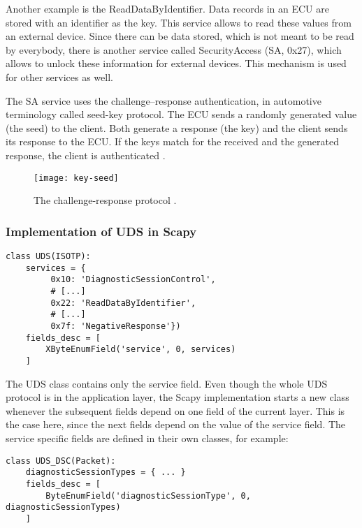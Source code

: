 Another example is the ReadDataByIdentifier. Data records in an ECU are stored with an identifier as the key. This service allows to read these values from an external device. Since there can be data stored, which is not meant to be read by everybody, there is another service called SecurityAccess (SA, 0x27), which allows to unlock these information for external devices. This mechanism is used for other services as well.

The SA service uses the challenge–response authentication, in automotive terminology called seed-key protocol. The ECU sends a randomly generated value (the seed) to the client. Both generate a response (the key) and the client sends its response to the ECU. If the keys match for the received and the generated response, the client is authenticated \cite{Herrewegen2018, iso14229}.

\begin{figure}[h]
    \centering
    \texttt{[image: key-seed]}
    \caption{The challenge-response protocol \cite{Herrewegen2018}.}
    \label{fig:key-seed}
\end{figure}


\subsubsection{Implementation of UDS in Scapy}

\begin{samepage}
\begin{verbatim}
class UDS(ISOTP):
    services = {
         0x10: 'DiagnosticSessionControl',
         # [...]
         0x22: 'ReadDataByIdentifier',
         # [...]
         0x7f: 'NegativeResponse'})
    fields_desc = [
        XByteEnumField('service', 0, services)
    ]
\end{verbatim}
\end{samepage}


The UDS class contains only the service field. Even though the whole UDS protocol is in the application layer, the Scapy implementation starts a new class whenever the subsequent fields depend on one field of the current layer. This is the case here, since the next fields depend on the value of the service field. The service specific fields are defined in their own classes, for example:

\begin{samepage}
\begin{verbatim}
class UDS_DSC(Packet):
    diagnosticSessionTypes = { ... }
    fields_desc = [
        ByteEnumField('diagnosticSessionType', 0,  diagnosticSessionTypes)
    ]
\end{verbatim}
\end{samepage}

